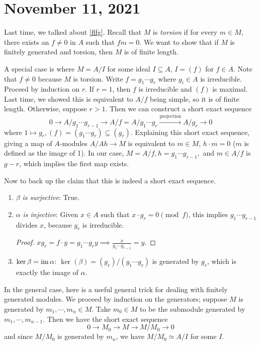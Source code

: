 \section{November 11, 2021} 
Last time, we talked about \cref{flfg}. Recall that $M$ is \emph{torsion} if for every $m \in M$, there exists an $f \neq 0$ in $A$ such that $fm=0$. We want to show that if $M$ is finitely generated and torsion, then $M$ is of finite length. 

A special case is where $M= A /I$ for some ideal $I \subseteq A$, $I=(f)$ for $f \in A$. Note that $f\neq 0$ because $M$ is torsion. Write $f=g_1 \cdots g_r$ where $g _i  \in A$ is irreducible. Proceed by induction on $r$. If $r=1$, then $f$ is irreducible and $(f)$ is maximal. Last time, we showed this is equivalent to $A /f$ being simple, so it is of finite length. Otherwise, suppose $r>1$. Then we can construct a short exact sequence \[
    0 \longrightarrow A / g_1 \cdots g_{r-1} \longrightarrow  A /f = A / g_1 \cdots g_r \xrightarrow{\text{projection}} A / g_r \longrightarrow 0
\] where $1 \mapsto g_r, (f)=(g_1 \cdots g_r) \subseteq (g_r)$. Explaining this short exact sequence, giving a map of $A$-modules $A / Ah \to M$ is equivalent to $m \in M$, $h\cdot m=0$ ($m$ is defined as the image of 1). In our case, $M = A /f, h=g_1 \cdots g_{r-1},$ and $m \in A /f$ is $g-r$, which implies the first map exists.

Now to back up the claim that this is indeed a short exact sequence. 
\begin{enumerate}[label=(\alph*)]
\setlength\itemsep{-.2em}
    \item $\beta $ \emph{is surjective}: True.
    \item $\alpha $ \emph{is injective}: Given $x \in A$ such that $x \cdot g_r=0\pmod f$, this implies $g_1 \cdots  g_{r-1}$ divides $x$, because $g_r$ is irreducible.
        \begin{proof}
            $x g_r=f \cdot y=g_1 \cdots  g_r y \implies  \frac{x}{g_1 \cdots g_{r-1}}=y$.
        \end{proof}
    \item $\ker \beta =\operatorname{im} \alpha $: $\ker (\beta )= (g_r) / (g_1 \cdots g_r)$ is generated by $g_r$, which is exactly the image of $\alpha $.
\end{enumerate}
In the general case, here is a useful general trick for dealing with finitely generated modules. We proceed by induction on the generators; suppose $M$ is generated by $m_1 ,\cdots , m_n  \in M$. Take $m_0 \in M$ to be the submodule generated by $m_1 , \cdots ,m_{n-1}$. Then we have the short exact sequence \[
0 \to  M_0 \to  M \to  M / M_0 \to 0
\] and since $M / M_0$ is generated by $m_n $, we have $M / M_0 \simeq  A / I$ for some $I$.

